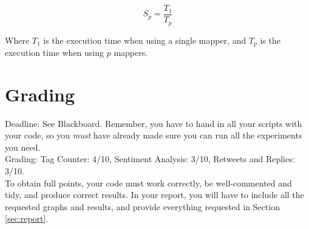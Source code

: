 \documentclass[a4paper,10pt]{article}
\begin{document}
  \[
  S_p = \frac{T_1}{T_p}
  \]
  
  Where $T_1$ is the execution time when using a single mapper, and $T_p$ is the execution time when using $p$ mappers.
  
  \section{Grading}
  Deadline: See Blackboard. Remember, you have to hand in all your scripts with your code, so you \emph{must} have already made sure you can run all the experiments you need.\\
  Grading: Tag Counter: 4/10, Sentiment Analysis: 3/10, Retweets and Replies: 3/10. \\
  To obtain full points, your code must work correctly, be well-commented and tidy, and produce correct results. In your report, you will have to include all the requested graphs and results, and provide everything requested in Section \ref{sec:report}.
\end{document}

